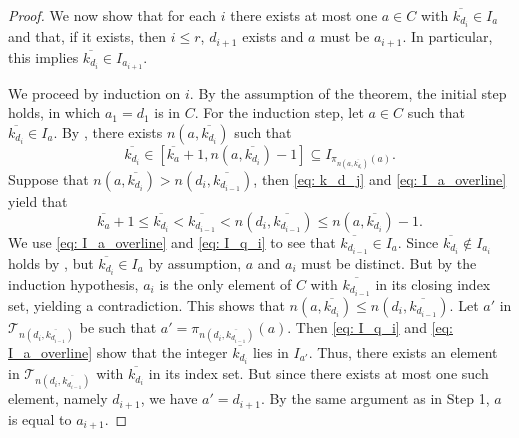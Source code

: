 \documentclass{preprint}
\newcommand{\cT}{\mathcal{T}}
\theoremstyle{definition}
\begin{document}
\begin{proof}
     We now show that for each $i$ there exists at most one $a \in C$ with $\overline{k_{d_i}} \in I_a$ and that, if it exists, then $i\leq r$, $d_{i+1}$ exists and $a$ must be $a_{i+1}$. In particular, this implies $\overline{k_{d_i}} \in I_{a_{i+1}}$.

    We proceed by induction on $i$. By the assumption of the theorem, the initial step holds, in which $a_1=d_1$ is in $C$. For the induction step, let $a \in C$ such that $\overline{k_{d_i}} \in I_a$. By , there exists $n(a,\overline{k_{d_i}})$ such that
    \begin{equation}\label{eq: I_a_overline}
        \overline{k_{d_i}} \in [\overline{k_a}+1,n(a,\overline{k_{d_i}})-1] \subseteq I_{\pi_{n(a,\overline{k_{d_i}})}(a)}.    
    \end{equation}
    Suppose that $n(a,\overline{k_{d_i}}) > n(d_i,\overline{k_{d_{i-1}}})$, then \eqref{eq: k_d_j} and \eqref{eq: I_a_overline} yield that
    $$
        \overline{k_a}+1 \leq \overline{k_{d_i}} < \overline{k_{d_{i-1}}} < n(d_i,\overline{k_{d_{i-1}}}) \leq n(a,\overline{k_{d_i}})-1.
    $$
    We use \eqref{eq: I_a_overline} and \eqref{eq: I_q_i} to see that $\overline{k_{d_{i-1}}} \in I_a$. Since $\overline{k_{d_i}} \notin I_{a_i}$ holds by , but $\overline{k_{d_i}} \in I_a$ by assumption, $a$ and $a_i$ must be distinct. But by the induction hypothesis, $a_i$ is the only element of $C$ with $\overline{k_{d_{i-1}}}$ in its closing index set, yielding a contradiction. This shows that $n(a,\overline{k_{d_i}}) \leq n(d_i,\overline{k_{d_{i-1}}})$. Let $a'$ in $\cT_{n(d_i,\overline{k_{d_{i-1}}})}$ be such that $a' = \pi_{n(d_i,\overline{k_{d_{i-1}}})}(a)$. Then \eqref{eq: I_q_i} and \eqref{eq: I_a_overline} show that the integer $\overline{k_{d_i}}$ lies in $I_{a'}$. Thus, there exists an element in $\cT_{n(d_i,\overline{k_{d_{i-1}}})}$ with $\overline{k_{d_i}}$ in its index set. But since there exists at most one such element, namely $d_{i+1}$, we have $a'=d_{i+1}$. By the same argument as in {\sf Step 1}, $a$ is equal to $a_{i+1}$.


\end{proof}
\end{document}
